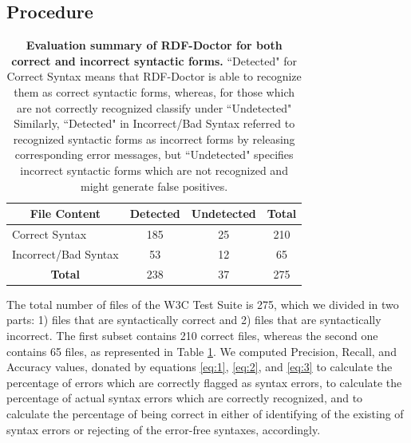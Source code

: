 \subsection{Procedure}

\begin{table}[]
\centering
\begin{tabular}{|l|c|c|c|}
\hline
 \multicolumn{1}{|c|}{\textbf{File Content}}  &{\textbf{Detected}}  &{\textbf{Undetected}} &{\textbf{Total}} \\ \hline
 Correct Syntax              &      185    &      25  & 210 \\ \hline
 Incorrect/Bad Syntax              &      53    &    12  & 65 \\ \hline
 \multicolumn{1}{|c|}{\textbf{Total}}            &      238   &       37 & 275  \\ \hline
\end{tabular}
\caption{\textbf{Evaluation summary of RDF-Doctor for both correct and incorrect syntactic forms.} ``Detected" for Correct Syntax means that RDF-Doctor is able to recognize them as correct syntactic forms, whereas, for those which are not correctly recognized classify under ``Undetected" Similarly, ``Detected" in Incorrect/Bad Syntax referred to recognized syntactic forms  as incorrect forms by releasing corresponding error messages, but ``Undetected" specifies  incorrect syntactic forms  which are not recognized and might generate false positives.}
\label{tab:TurtleSuit}
\end{table}

The total number of files of the W3C Test Suite is 275, which we divided in two parts: 1) files that are syntactically correct and 2) files that are syntactically incorrect.
The first subset contains 210 correct files, whereas the second one contains 65 files, as represented in Table \ref{tab:TurtleSuit}.
We computed Precision, Recall, and Accuracy values, donated by equations \ref{eq:1}, \ref{eq:2}, and \ref{eq:3} to calculate the percentage of errors which are correctly flagged as syntax errors, to calculate the percentage of actual syntax errors which are correctly recognized, and to calculate the percentage of being correct in either of identifying of the existing of syntax errors or rejecting of the error-free syntaxes, accordingly. 



